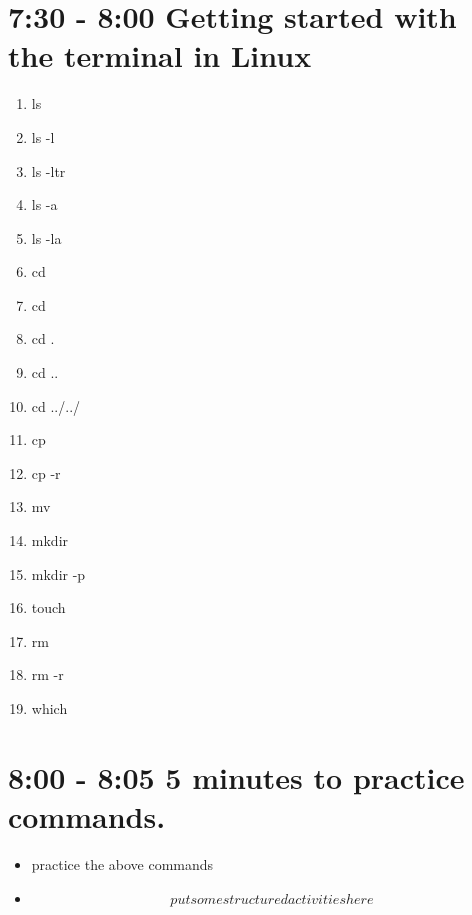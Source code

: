 \documentclass[10pt]{article}
\begin{document}
\section{7:30 - 8:00 Getting started with the terminal in Linux}
\begin{multicols}{4}
\begin{enumerate}
\item ls
\item ls -l
\item ls -ltr
\item ls -a
\item ls -la
\item cd $~$
\item cd
\item cd .
\item cd ..
\item cd ../../
\item cp
\item cp -r
\item mv
\item mkdir
\item mkdir -p
\item touch
\item rm 
\item rm -r
\item which 
\end{enumerate}
\end{multicols}
\section{8:00 - 8:05 5 minutes to practice commands. }

\begin{itemize}
\item practice the above commands
\item \[put some structured activities here \]
\end{itemize}
\end{document}
